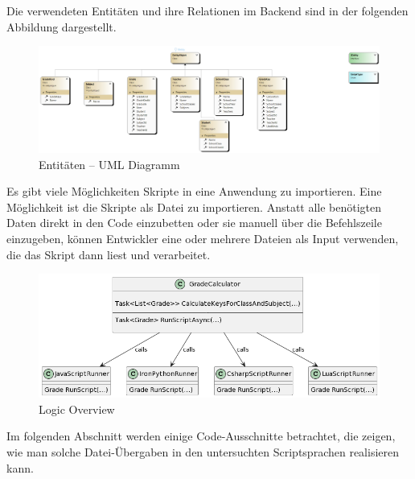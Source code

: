 \newpage

Die verwendeten Entitäten und ihre Relationen im Backend sind in der folgenden Abbildung dargestellt.

\begin{figure}[H]
    \centering
    \includegraphics[scale=0.5]{pics/EntitiesClassDiagram.png}
    \caption{Entitäten -- UML Diagramm}
    \label{fig:impl:Entities}
\end{figure}

\newpage
Es gibt viele Möglichkeiten Skripte in eine Anwendung zu importieren.
Eine Möglichkeit ist die Skripte als Datei zu importieren.
Anstatt alle benötigten Daten direkt in den Code einzubetten oder sie manuell über die Befehlszeile einzugeben, 
können Entwickler eine oder mehrere Dateien als Input verwenden, die das Skript dann liest und verarbeitet.

\begin{figure}[H]
    \centering
    \includegraphics[scale=0.5]{pics/LogicClassDiagram.png}
    \caption{Logic Overview}
    \label{fig:impl:Logic}
\end{figure}


\newpage
Im folgenden Abschnitt  werden einige Code-Ausschnitte betrachtet, die zeigen, wie man solche Datei-Übergaben in den untersuchten Scriptsprachen realisieren kann. 

